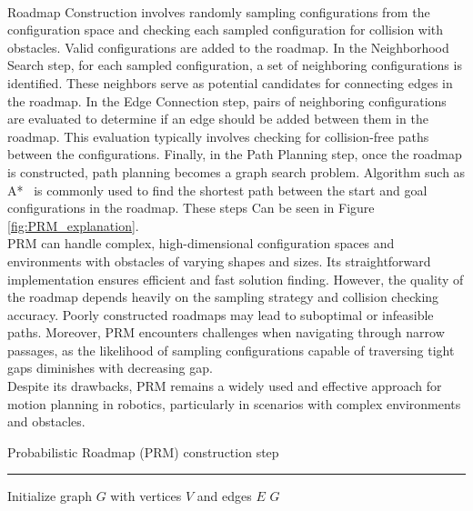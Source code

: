 \documentclass{ctuthesis}
\begin{document}
\\
Roadmap Construction involves randomly sampling configurations from the configuration space and 
checking each sampled configuration for collision with obstacles. 
Valid configurations are added to the roadmap.
In the Neighborhood Search step, for each sampled configuration, 
a set of neighboring configurations is identified. 
These neighbors serve as potential candidates for connecting edges in the roadmap.
In the Edge Connection step, 
pairs of neighboring configurations are evaluated to determine 
if an edge should be added between them in the roadmap. 
This evaluation typically involves checking for collision-free paths between the configurations.
Finally, in the Path Planning step, once the roadmap is constructed, 
path planning becomes a graph search problem. 
Algorithm such as A*~\cite{Hart1968Astar} is commonly used to find the shortest path 
between the start and goal configurations in the roadmap.
These steps Can be seen in Figure \ref{fig:PRM_explanation}.
\\[12pt]
PRM can handle complex, high-dimensional configuration spaces and 
environments with obstacles of varying shapes and sizes.
Its straightforward implementation ensures efficient and fast solution finding.
However, the quality of the roadmap depends heavily on the sampling strategy and 
collision checking accuracy. 
Poorly constructed roadmaps may lead to suboptimal or infeasible paths.
Moreover, PRM encounters challenges when navigating through narrow passages, 
as the likelihood of sampling configurations capable of traversing tight gaps diminishes 
with decreasing gap.\\[12pt]
Despite its drawbacks, 
PRM remains a widely used and effective approach for motion planning in robotics, 
particularly in scenarios with complex environments and obstacles.\\

\begin{algorithm}[H]
  \caption{Probabilistic Roadmap (PRM) construction step}
  \label{alg:prm_constraction} 
  \vspace{0.1cm}
  \hrule
  \vspace{0.2cm}
  Initialize graph $G$ with vertices $V$ and edges $E$\;
  \Return $G$\;
\end{algorithm}
\end{document}
